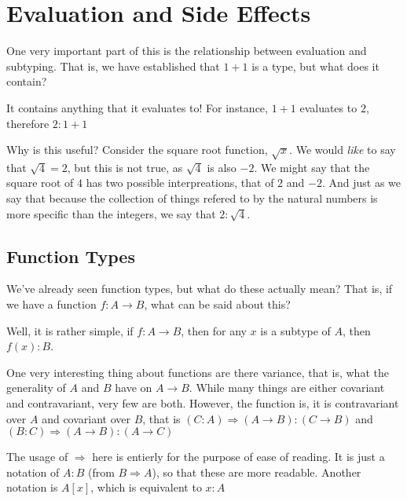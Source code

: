 
%
%
%
%
%





\section{Evaluation and Side Effects}
One very important part of this is the relationship between evaluation and subtyping.
That is, we have established that $1+1$ is a type, but what does it contain?

It contains anything that it evaluates to!
For instance, $1+1$ evaluates to $2$, therefore $2 : 1+1$

Why is this useful?
Consider the square root function, $\sqrt{x}$. We would \emph{like} to say that $\sqrt{4} = 2$, but this is not true, as $\sqrt{4}$ is also $-2$.
We might say that the square root of $4$ has two possible interpreations, that of $2$ and $-2$.
And just as we say that because the collection of things refered to by the natural numbers is more specific than the integers, we say that $2 : \sqrt{4}$. 

\subsection{Function Types}
We've already seen function types, but what do these actually mean?
That is, if we have a function $f : A \to B$, what can be said about this?

Well, it is rather simple, if $f : A \to B$, then for any $x$ is a subtype of $A$, then $f(x) : B$.

One very interesting thing about functions are there variance, that is, what the generality of $A$ and $B$ have on $A \to B$.
While many things are either covariant and contravariant, very few are both.
However, the function is, it is contravariant over $A$ and covariant over $B$, that is $(C : A) \Rightarrow (A \to B) : (C \to B)$ and $(B : C) \Rightarrow (A \to B) : (A \to C)$ 

The usage of $\Rightarrow$ here is entierly for the purpose of ease of reading. 
It is just a notation of $A : B$ (from $B \Rightarrow A$), so that these are more readable.
Another notation is $A[x]$, which is equivalent to $x : A$